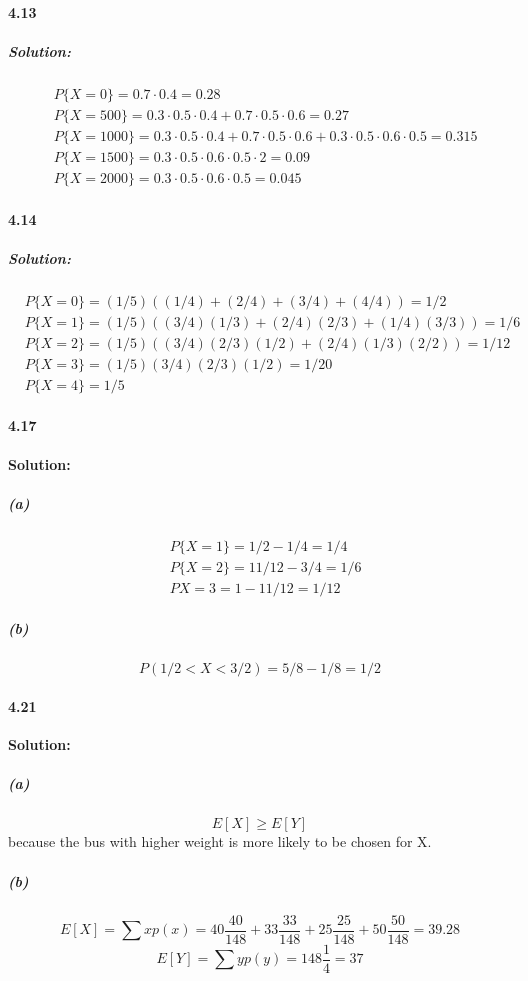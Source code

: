 \documentclass[11pt]{article}
\begin{document}
	\paragraph{4.13}
		\subparagraph{Solution:}
		\begin{align}
			&P\{X = 0\} = 0.7\cdot 0.4 = 0.28\nonumber\\
			&P\{X = 500\} = 0.3\cdot 0.5\cdot 0.4 + 0.7\cdot 0.5\cdot 0.6 = 0.27\nonumber\\
			&P\{X = 1000\} = 0.3\cdot 0.5\cdot 0.4 + 0.7\cdot 0.5\cdot 0.6 + 0.3\cdot 0.5 \cdot 0.6 \cdot 0.5 = 0.315\nonumber\\
			&P\{X = 1500\} = 0.3\cdot 0.5 \cdot 0.6 \cdot 0.5\cdot 2 = 0.09\nonumber\\
			&P\{X = 2000\} = 0.3\cdot 0.5 \cdot 0.6 \cdot 0.5 = 0.045\nonumber
		\end{align}
	\paragraph{4.14}
		\subparagraph{Solution:}
			\begin{align}
				&P\{X = 0\} = (1/5)((1/4) + (2/4) + (3/4) + (4/4)) = 1/2\nonumber\\
				&P\{X = 1\} = (1/5)((3/4)(1/3) + (2/4)(2/3) + (1/4)(3/3)) = 1/6\nonumber\\
				&P\{X = 2\} = (1/5)((3/4)(2/3)(1/2) + (2/4)(1/3)(2/2)) = 1/12\nonumber\\
				&P\{X = 3\} = (1/5)(3/4)(2/3)(1/2) = 1/20\nonumber\\
				&P\{X = 4\} = 1/5\nonumber
			\end{align}
	\paragraph{4.17}\textbf{Solution:}
		\subparagraph{(a)}
			\begin{align}
				&P\{X = 1\} = 1/2 - 1/4 = 1/4\nonumber\\
				&P\{X = 2\} = 11/12 - 3/4 = 1/6\nonumber\\
				&P{X = 3} = 1 - 11/12 = 1/12\nonumber
			\end{align}
		\subparagraph{(b)}
			\[P(1/2 < X < 3/2) = 5/8 - 1/8 = 1/2\]
	\paragraph{4.21}\textbf{Solution:}
		\subparagraph{(a)}
			\[E[X] \geq E[Y]\] because the bus with higher weight is more likely to be chosen for X. 
		\subparagraph{(b)}
			\[E[X] = \sum xp(x) = 40 \frac{40}{148} + 33 \frac{33}{148} + 25 \frac{25}{148} + 50 \frac{50}{148} = 39.28\]
			\[E[Y] = \sum yp(y) = 148 \frac{1}{4} = 37\]
\end{document}
